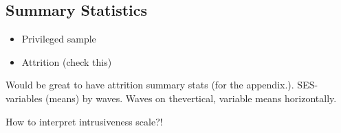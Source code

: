 \subsection{Summary Statistics}
\begin{itemize}
	\item Privileged sample
	\item Attrition (check this)
\end{itemize}

Would be great to have attrition summary stats (for the appendix.). SES-variables (means) by waves. Waves on thevertical, variable means horizontally.


How to interpret intrusiveness scale?!
